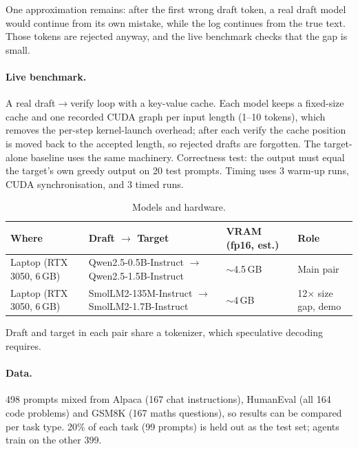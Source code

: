 One approximation remains: after the first wrong draft token, a real draft model would continue from its own mistake, while the log continues from the true text. Those tokens are rejected anyway, and the live benchmark checks that the gap is small.

\paragraph{Live benchmark.} A real draft$\to$verify loop with a key-value cache. Each model keeps a fixed-size cache and one recorded CUDA graph per input length (1--10 tokens), which removes the per-step kernel-launch overhead; after each verify the cache position is moved back to the accepted length, so rejected drafts are forgotten. The target-alone baseline uses the same machinery. Correctness test: the output must equal the target's own greedy output on 20 test prompts. Timing uses 3 warm-up runs, CUDA synchronisation, and 3 timed runs.

\begin{table}[h]
\centering
\caption{Models and hardware.}
\label{tab:models}
\small
\begin{tabularx}{\linewidth}{@{}lXll@{}}
\toprule
Where & Draft $\to$ Target & VRAM (fp16, est.) & Role \\
\midrule
Laptop (RTX 3050, 6\,GB) & Qwen2.5-0.5B-Instruct $\to$ Qwen2.5-1.5B-Instruct & $\sim$4.5\,GB & Main pair \\
Laptop (RTX 3050, 6\,GB) & SmolLM2-135M-Instruct $\to$ SmolLM2-1.7B-Instruct & $\sim$4\,GB & 12$\times$ size gap, demo \\
\bottomrule
\end{tabularx}
\end{table}

Draft and target in each pair share a tokenizer, which speculative decoding requires.

\paragraph{Data.} 498 prompts mixed from Alpaca (167 chat instructions), HumanEval (all 164 code problems) and GSM8K (167 maths questions), so results can be compared per task type. 20\% of each task (99 prompts) is held out as the test set; agents train on the other 399.
